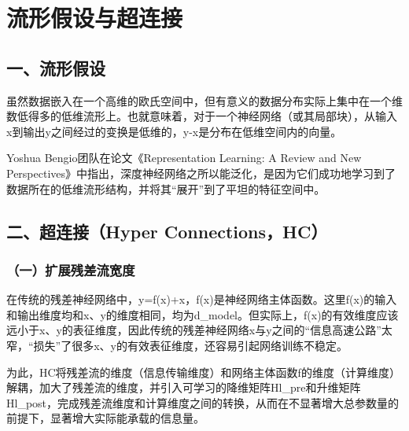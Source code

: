 \setcounter{section}{2}

\hypertarget{ux6d41ux5f62ux5047ux8bbeux4e0eux8d85ux8fdeux63a5}{%
\section{流形假设与超连接}\label{ux6d41ux5f62ux5047ux8bbeux4e0eux8d85ux8fdeux63a5}}

\hypertarget{ux4e00ux6d41ux5f62ux5047ux8bbe}{%
\subsection{一、流形假设}\label{ux4e00ux6d41ux5f62ux5047ux8bbe}}

虽然数据嵌入在一个高维的欧氏空间中，但有意义的数据分布实际上集中在一个维数低得多的低维流形上。也就意味着，对于一个神经网络（或其局部块），从输入x到输出y之间经过的变换是低维的，y-x是分布在低维空间内的向量。

Yoshua Bengio团队在论文《Representation Learning: A Review and New Perspectives》中指出，深度神经网络之所以能泛化，是因为它们成功地学习到了数据所在的低维流形结构，并将其``展开''到了平坦的特征空间中。

\hypertarget{ux4e8cux8d85ux8fdeux63a5hyper-connectionshc}{%
\subsection{二、超连接（Hyper Connections，HC）}\label{ux4e8cux8d85ux8fdeux63a5hyper-connectionshc}}

\hypertarget{ux4e00ux6269ux5c55ux6b8bux5deeux6d41ux5bbdux5ea6}{%
\subsubsection{（一）扩展残差流宽度}\label{ux4e00ux6269ux5c55ux6b8bux5deeux6d41ux5bbdux5ea6}}

在传统的残差神经网络中，y=f(x)+x，f(x)是神经网络主体函数。这里f(x)的输入和输出维度均和x、y的维度相同，均为d\_model。但实际上，f(x)的有效维度应该远小于x、y的表征维度，因此传统的残差神经网络x与y之间的``信息高速公路''太窄，``损失''了很多x、y的有效表征维度，还容易引起网络训练不稳定。

为此，HC将残差流的维度（信息传输维度）和网络主体函数f的维度（计算维度）解耦，加大了残差流的维度，并引入可学习的降维矩阵Hl\_pre和升维矩阵Hl\_post，完成残差流维度和计算维度之间的转换，从而在不显著增大总参数量的前提下，显著增大实际能承载的信息量。

